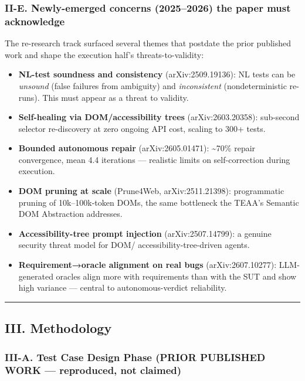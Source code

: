 \documentclass[
]{article}
\providecommand{\tightlist}{%
  \setlength{\itemsep}{0pt}\setlength{\parskip}{0pt}}
\begin{document}
\subsubsection{II-E. Newly-emerged concerns (2025--2026) the paper must
acknowledge}\label{ii-e.-newly-emerged-concerns-20252026-the-paper-must-acknowledge}

The re-research track surfaced several themes that postdate the prior
published work and shape the execution half's threats-to-validity:

\begin{itemize}
\tightlist
\item
  \textbf{NL-test soundness and consistency} (arXiv:2509.19136): NL
  tests can be \emph{unsound} (false failures from ambiguity) and
  \emph{inconsistent} (nondeterministic re-runs). This must appear as a
  threat to validity.
\item
  \textbf{Self-healing via DOM/accessibility trees} (arXiv:2603.20358):
  sub-second selector re-discovery at zero ongoing API cost, scaling to
  300+ tests.
\item
  \textbf{Bounded autonomous repair} (arXiv:2605.01471):
  \textasciitilde70\% repair convergence, mean 4.4 iterations ---
  realistic limits on self-correction during execution.
\item
  \textbf{DOM pruning at scale} (Prune4Web, arXiv:2511.21398):
  programmatic pruning of 10k--100k-token DOMs, the same bottleneck the
  TEAA's Semantic DOM Abstraction addresses.
\item
  \textbf{Accessibility-tree prompt injection} (arXiv:2507.14799): a
  genuine security threat model for DOM/ accessibility-tree-driven
  agents.
\item
  \textbf{Requirement→oracle alignment on real bugs} (arXiv:2607.10277):
  LLM-generated oracles align more with requirements than with the SUT
  and show high variance --- central to autonomous-verdict reliability.
\end{itemize}

\begin{center}\rule{0.5\linewidth}{0.5pt}\end{center}

\subsection{III. Methodology}\label{iii.-methodology}

\subsubsection{III-A. Test Case Design Phase (PRIOR PUBLISHED WORK ---
reproduced, not
claimed)}\label{iii-a.-test-case-design-phase-prior-published-work-reproduced-not-claimed}
\end{document}
